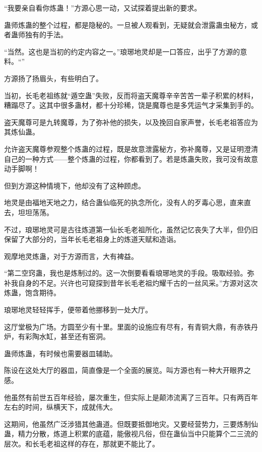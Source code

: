 
\begin{this_body}

“我要亲自看你炼蛊！”方源心思一动，又试探着提出新的要求。

蛊师炼蛊的整个过程，都是隐秘的。一旦被人观看到，无疑就会泄露蛊虫秘方，或者蛊师独有的手法。

“当然。这也是当初的约定内容之一。”琅琊地灵却是一口答应，出乎了方源的意料。“”

方源扬了扬眉头，有些明白了。

当初，长毛老祖练就“遁空蛊”失败，反而将盗天魔尊辛辛苦苦一辈子积累的材料，糟蹋尽了。这其中很多蛊材，都十分珍稀，饶是魔尊也是多凭运气才采集到手的。

盗天魔尊可是九转魔尊，为了弥补他的损失，以及挽回自家声誉，长毛老祖答应为其炼仙蛊。

允许盗天魔尊参观整个炼蛊的过程，既是故意泄露秘方，弥补魔尊，又是证明澄清自己的一种方式——整个炼蛊的过程，你都看到了。若是炼蛊失败，我可没有故意动手脚啊！

但到方源这种情境下，他却没有了这种顾虑。

地灵是由福地天地之力，结合蛊仙临死的执念所化，没有人的歹毒心思，直来直去，坦坦荡荡。

不过，琅琊地灵可是古往炼道第一仙长毛老祖所化，虽然记忆丧失了大半，但仍旧保留了大部分的，当年长毛老祖身上的炼道天赋和造诣。

观摩地灵炼蛊，对于方源而言，大有裨益。

“第二空窍蛊，我也是炼制过的。这一次倒要看看琅琊地灵的手段。吸取经验。弥补我自身的不足。兴许也可窥探到昔年长毛老祖灼耀千古的一丝风采。”方源对这次炼蛊，饱含期待。

琅琊地灵轻轻挥手，便带着他挪移到一处大厅。

这厅堂极为广场。方圆至少有十里。里面的设施应有尽有，有青铜大鼎，有赤铁丹炉，有彩陶水缸，甚至还有窑洞。

蛊师炼蛊，有时候也需要器皿辅助。

陈设在这处大厅的器皿，简直像是一个全面的展览。叫方源也有一种大开眼界之感。

他虽然有前世五百年经验，屡次重生，但实际上是颠沛流离了三百年。只有两百年左右的时间，纵横天下，成就伟大。

这期间，他虽然广泛涉猎其他蛊道。但既要抵御地灾。又要经营势力，三要炼制仙蛊，精力分散，炼道上积累的底蕴，能傲视凡俗，但在蛊仙当中只能算个二三流的层次。和长毛老祖这样的存在，那就更不能比了。


\end{this_body}

